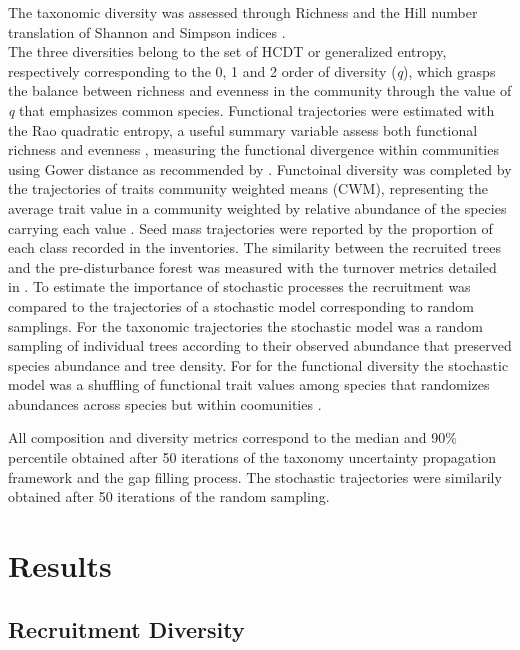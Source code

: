 \documentclass[fleqn,10pt]{ArtEcoFoG} %
\begin{document}
The taxonomic diversity was assessed through Richness and the Hill
number translation of Shannon and Simpson indices
\citep{Hill1973, chao2015estimating, Marcon2015b}.\\
The three diversities belong to the set of HCDT or generalized entropy,
respectively corresponding to the 0, 1 and 2 order of diversity
(\emph{q}), which grasps the balance between richness and evenness in
the community through the value of \emph{q} that emphasizes common
species. Functional trajectories were estimated with the Rao quadratic
entropy, a useful summary variable assess both functional richness and
evenness \citep{Clark2012}, measuring the functional divergence within
communities using Gower distance as recommended by \citet{Pavoine2009}.
Functoinal diversity was completed by the trajectories of traits
community weighted means (CWM), representing the average trait value in
a community weighted by relative abundance of the species carrying each
value \citep{Diaz2007, Garnier2004, Mason2013}. Seed mass trajectories
were reported by the proportion of each class recorded in the
inventories. The similarity between the recruited trees and the
pre-disturbance forest was measured with the turnover metrics detailed
in \citet{Podani2013a}. To estimate the importance of stochastic
processes the recruitment was compared to the trajectories of a
stochastic model corresponding to random samplings. For the taxonomic
trajectories the stochastic model was a random sampling of individual
trees according to their observed abundance that preserved species
abundance and tree density. For for the functional diversity the
stochastic model was a shuffling of functional trait values among
species that randomizes abundances across species but within coomunities
\citep{Mason2013}.

All composition and diversity metrics correspond to the median and 90\%
percentile obtained after 50 iterations of the taxonomy uncertainty
propagation framework and the gap filling process. The stochastic
trajectories were similarily obtained after 50 iterations of the random
sampling.

\section{Results}\label{results}

\subsection{Recruitment Diversity}\label{recruitment-diversity}
\end{document}
